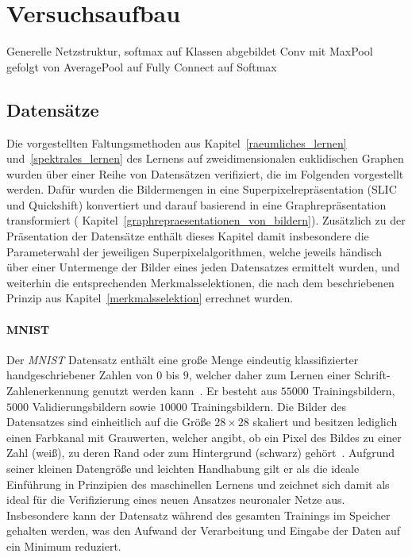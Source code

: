 \section{Versuchsaufbau}
\label{versuchsaufbau}

Generelle Netzstruktur, softmax auf Klassen abgebildet
Conv mit MaxPool gefolgt von AveragePool auf Fully Connect auf Softmax

\subsection{Datensätze}
\label{datensaetze}

Die vorgestellten Faltungsmethoden aus Kapitel~\ref{raeumliches_lernen} und~\ref{spektrales_lernen} \bzgl{} des Lernens auf zweidimensionalen euklidischen Graphen wurden über einer Reihe von Datensätzen verifiziert, die im Folgenden vorgestellt werden.
Dafür wurden die Bildermengen in eine Superpixelrepräsentation (\gls{SLIC} und Quickshift) konvertiert und darauf basierend in eine Graphrepräsentation transformiert (\vgl{} Kapitel~\ref{graphrepraesentationen_von_bildern}).
Zusätzlich zu der Präsentation der Datensätze enthält dieses Kapitel damit insbesondere die Parameterwahl der jeweiligen Superpixelalgorithmen, welche jeweils händisch über einer Untermenge der Bilder eines jeden Datensatzes ermittelt wurden, und weiterhin die entsprechenden Merkmalsselektionen, die nach dem beschriebenen Prinzip aus Kapitel~\ref{merkmalsselektion} errechnet wurden.

\paragraph{MNIST}
\label{mnist}

Der \emph{\gls{MNIST}} Datensatz enthält eine große Menge eindeutig klassifizierter handgeschriebener Zahlen von $0$ bis $9$, welcher daher zum Lernen einer Schrift- \bzw{} Zahlenerkennung genutzt werden kann~\cite{mnist}.
Er besteht aus $55000$ Trainingsbildern, $5000$ Validierungsbildern sowie $10000$ Trainingsbildern.
Die Bilder des Datensatzes sind einheitlich auf die Größe $28 \times 28$ skaliert und besitzen lediglich einen Farbkanal mit Grauwerten, welcher angibt, ob ein Pixel des Bildes zu einer Zahl (weiß), zu deren Rand oder zum Hintergrund (schwarz) gehört~\cite{mnist}.
Aufgrund seiner kleinen Datengröße und leichten Handhabung gilt er als die ideale Einführung in Prinzipien des maschinellen Lernens und zeichnet sich damit als ideal für die Verifizierung eines neuen Ansatzes \bzgl{} neuronaler Netze aus.
Insbesondere kann der Datensatz während des gesamten Trainings im Speicher gehalten werden, was den Aufwand \bzgl{} der Verarbeitung und Eingabe der Daten auf ein Minimum reduziert.

